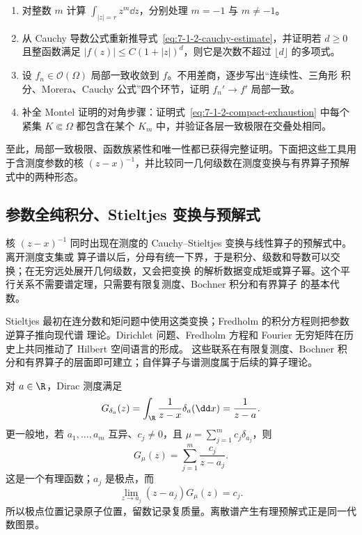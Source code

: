\begin{exercise}
\begin{enumerate}
  \item 对整数 $m$ 计算 $\int_{|z|=r}z^m\dd z$，分别处理 $m=-1$ 与 $m\ne-1$。
  \item 从 Cauchy 导数公式重新推导式~\eqref{eq:7-1-2-cauchy-estimate}，并证明若 $d\ge0$ 且整函数满足
        $|f(z)|\le C(1+|z|)^d$，则它是次数不超过 $\lfloor d\rfloor$ 的多项式。
  \item 设 $f_n\in\mathcal O(\Omega)$ 局部一致收敛到 $f$。不用差商，逐步写出“连续性、三角形
        积分、Morera、Cauchy 公式”四个环节，证明 $f_n'\to f'$ 局部一致。
  \item 补全 Montel 证明的对角步骤：证明式~\eqref{eq:7-1-2-compact-exhaustion} 中每个紧集
        $K\Subset\Omega$ 都包含在某个 $K_m$ 中，并验证各层一致极限在交叠处相同。
\end{enumerate}
\end{exercise}

至此，局部一致极限、函数族紧性和唯一性都已获得完整证明。下面把这些工具用于含测度参数的核
$(z-x)^{-1}$，并比较同一几何级数在测度变换与有界算子预解式中的两种形态。


\subsection{参数全纯积分、Stieltjes 变换与预解式}\label{subsec:7-1-3}

核 $(z-x)^{-1}$ 同时出现在测度的 Cauchy--Stieltjes 变换与线性算子的预解式中。离开测度支集或
算子谱以后，分母有统一下界，于是积分、级数和导数可以交换；在无穷远处展开几何级数，又会把变换
的解析数据变成矩或算子幂。这个平行关系不需要谱定理，只需要有限复测度、Bochner 积分和有界算子
的基本代数。

Stieltjes 最初在连分数和矩问题中使用这类变换；Fredholm 的积分方程则把参数逆算子推向现代谱
理论。Dirichlet 问题、Fredholm 方程和 Fourier 无穷矩阵在历史上共同推动了 Hilbert 空间语言的形成。
这些联系在有限复测度、Bochner 积分和有界算子的层面即可建立；自伴算子与谱测度属于后续的算子理论。

\begin{example}\label{ex:7-1-3-1}
对 $a\in\R$，Dirac 测度满足
\[
  G_{\delta_a}(z)=\int_\R\frac1{z-x}\delta_a(\dd x)=\frac1{z-a}.
\]
更一般地，若 $a_1,\ldots,a_m$ 互异、$c_j\ne0$，且
$\mu=\sum_{j=1}^mc_j\delta_{a_j}$，则
\[
  G_\mu(z)=\sum_{j=1}^m\frac{c_j}{z-a_j}.
\]
这是一个有理函数；$a_j$ 是极点，而
\[
 \lim_{z\to a_j}(z-a_j)G_\mu(z)=c_j.
\]
所以极点位置记录原子位置，留数记录复质量。离散谱产生有理预解式正是同一代数图景。
\end{example}

